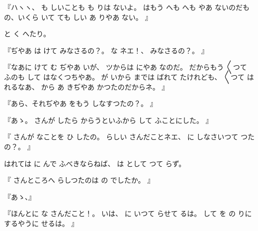 『ハヽヽ、
も
しいことも
も
りは
ないよ。
はもう
へも
へも
やあ
ないのだもの、いくら
いて
ても
しい
あ
りやあ
ない。
』

と
く
へたり。

『ぢやあ
は
けて
みなさるの？。
な
ネエ！、
みなさるの？。
』

『なあに
けて
む
ぢやあ
いが、
ツからは
にやあ
なのだ。
だからもう
〳〵つて
ふのも
して
はなくつちやあ。
が
いから
までは
ばれて
たけれども、
〳〵つて
はれるなあ、
から
あ
きぢやあ
かつたのだからネ。
』

『あら、それぢやあ
をもう
しなすつたの？。
』

『あゝ。
さんが
したら
からうといふから
して
ふことにした。
』

『
さんが
なことを
ひ
したの。
らしい
さんだことネエ、
に
しなさいつて
つたの？。
』

はれては
に
んで
ふべきならねば、
は
として
つて
らず。

『
さんところへ
らしつたのは
の
でしたか。
』

『あゝ、』

『ほんとに
な
さんだこと！。
いは、
に
いつて
らせて
るは。
して
を
の
りにするやうに
せるは。
』


